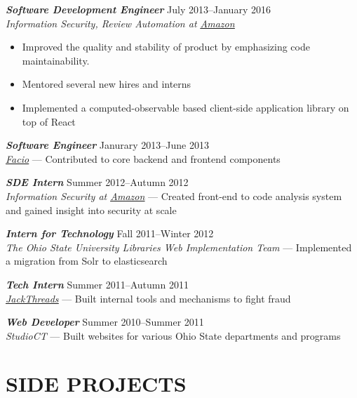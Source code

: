 \documentclass[line,letterpaper]{resume}
\begin{document}
\begin{resume}
    {\sl\textbf{Software Development Engineer}} \hfill July 2013--January
    2016\\
    \emph{Information Security, Review Automation at
    \underline{\href{http://www.amazon.com/}{Amazon}}}
    \begin{itemize}
        \item Improved the quality and stability of product by emphasizing code
            maintainability.
        \item Mentored several new hires and interns
        \item Implemented a computed-observable based client-side application
            library on top of React
    \end{itemize}
    \vspace{-6pt}

    {\sl\textbf{Software Engineer}} \hfill Janurary 2013--June 2013\\
    \emph{\underline{\href{http://www.facio.com/}{Facio}}} --- Contributed to core backend and frontend components
    \vspace{-6pt}

    {\sl\textbf{SDE Intern}} \hfill Summer 2012--Autumn 2012\\
    \emph{Information Security at
    \underline{\href{http://www.amazon.com/}{Amazon}}} --- Created front-end to code analysis system and gained insight into security at scale
    \vspace{-6pt}

    {\sl\textbf{Intern for Technology}} \hfill Fall 2011--Winter 2012\\
    \emph{The Ohio State University Libraries Web Implementation Team} --- Implemented a migration from Solr to elasticsearch
    \vspace{-6pt}

    {\sl\textbf{Tech Intern}} \hfill Summer 2011--Autumn 2011\\
    \emph{\underline{\href{http://www.jackthreads.com/}{JackThreads}}}
    --- Built internal tools and mechanisms to fight fraud
    \vspace{-6pt}

    {\sl\textbf{Web Developer}} \hfill Summer 2010--Summer 2011\\
    \emph{StudioCT} --- Built websites for various Ohio State departments and programs
    \vspace{-6pt}


    \section{\uppercase{Side Projects}}


\end{resume}
\end{document}

